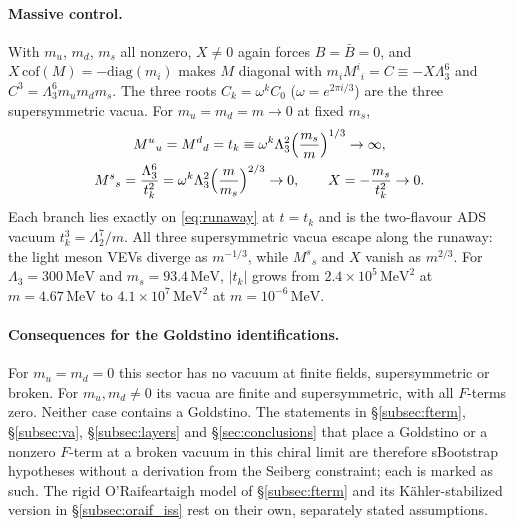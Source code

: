 \documentclass[12pt,a4paper]{article}
\newcommand{\MeV}{\,\text{MeV}}
\begin{document}
\paragraph{Massive control.}
With $m_u$, $m_d$, $m_s$ all nonzero, $X \neq 0$ again forces
$B = \bar B = 0$, and $X\,\mathrm{cof}(M) = -\mathrm{diag}(m_i)$ makes
$M$ diagonal with $m_i M^i{}_i = C \equiv -X\Lambda_3^6$ and
$C^3 = \Lambda_3^6 m_u m_d m_s$. The three roots
$C_k = \omega^k C_0$ ($\omega = e^{2\pi i/3}$) are the three
supersymmetric vacua. For $m_u = m_d = m \to 0$ at fixed $m_s$,
\begin{gather*}
M^u{}_u = M^d{}_d = t_k \equiv \omega^k\Lambda_3^2
\Bigl(\frac{m_s}{m}\Bigr)^{1/3} \to \infty,\\
M^s{}_s = \frac{\Lambda_3^6}{t_k^2}
= \omega^k\Lambda_3^2\Bigl(\frac{m}{m_s}\Bigr)^{2/3} \to 0,\qquad
X = -\frac{m_s}{t_k^2} \to 0 .
\end{gather*}
Each branch lies exactly on \eqref{eq:runaway} at $t = t_k$ and is the
two-flavour ADS vacuum $t_k^3 = \Lambda_2^7/m$. All three
supersymmetric vacua escape along the runaway: the light meson VEVs
diverge as $m^{-1/3}$, while $M^s{}_s$ and $X$ vanish as $m^{2/3}$.
For $\Lambda_3 = 300\MeV$ and $m_s = 93.4\MeV$, $|t_k|$ grows from
$2.4\times10^5\MeV^2$ at $m = 4.67\MeV$ to $4.1\times10^7\MeV^2$ at
$m = 10^{-6}\MeV$.

\paragraph{Consequences for the Goldstino identifications.}
For $m_u = m_d = 0$ this sector has no vacuum at finite fields,
supersymmetric or broken. For $m_u, m_d \neq 0$ its vacua are finite
and supersymmetric, with all $F$-terms zero. Neither case contains a
Goldstino. The statements in \S\ref{subsec:fterm}, \S\ref{subsec:va},
\S\ref{subsec:layers} and \S\ref{sec:conclusions} that place a
Goldstino or a nonzero $F$-term at a broken vacuum in this chiral limit
are therefore sBootstrap hypotheses without a derivation from the
Seiberg constraint; each is marked as such. The
rigid O'Raifeartaigh model of \S\ref{subsec:fterm} and its
K\"ahler-stabilized version in \S\ref{subsec:oraif_iss} rest on their
own, separately stated assumptions.
\end{document}
